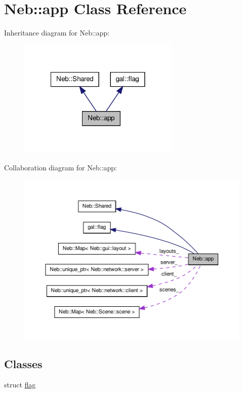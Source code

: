\hypertarget{classNeb_1_1app}{\section{\-Neb\-:\-:app \-Class \-Reference}
\label{classNeb_1_1app}
}


\-Inheritance diagram for \-Neb\-:\-:app\-:\nopagebreak
\begin{figure}[H]
\begin{center}
\leavevmode
\includegraphics[width=218pt]{classNeb_1_1app__inherit__graph}
\end{center}
\end{figure}


\-Collaboration diagram for \-Neb\-:\-:app\-:\nopagebreak
\begin{figure}[H]
\begin{center}
\leavevmode
\includegraphics[width=350pt]{classNeb_1_1app__coll__graph}
\end{center}
\end{figure}
\subsection*{\-Classes}
\begin{DoxyCompactItemize}
\item 
struct \hyperlink{structNeb_1_1app_1_1flag}{flag}
\end{DoxyCompactItemize}
